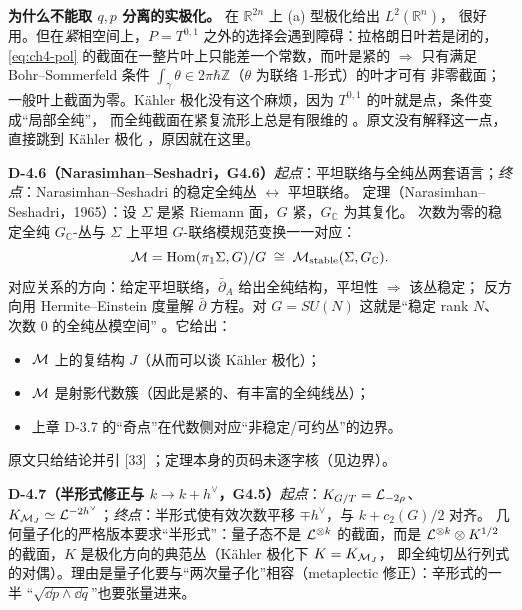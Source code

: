 \begin{keypoint}
\textbf{为什么不能取 $q,p$ 分离的实极化。} 在 $\mathbb R^{2n}$ 上 (a) 型极化给出 $L^2(\mathbb R^n)$，
很好用。但在\emph{紧}相空间上，$P=T^{0,1}$ 之外的选择会遇到障碍：拉格朗日叶若是闭的，
\eqref{eq:ch4-pol} 的截面在一整片叶上只能差一个常数，而叶是紧的 $\Rightarrow$ 只有满足
Bohr--Sommerfeld 条件 $\int_\gamma\theta\in2\pi\hbar\mathbb Z$（$\theta$ 为联络 1-形式）的叶才可有
非零截面；一般叶上截面为零。Kähler 极化没有这个麻烦，因为 $T^{0,1}$ 的叶就是点，条件变成“局部全纯”，
而全纯截面在紧复流形上总是有限维的 \ours。原文没有解释这一点，直接跳到 Kähler 极化
，原因就在这里。
\end{keypoint}

\noindent\textbf{D-4.6（Narasimhan--Seshadri，G4.6）}\quad\emph{起点}：平坦联络与全纯丛两套语言；\emph{终点}：Narasimhan--Seshadri 的稳定全纯丛 $\leftrightarrow$ 平坦联络。
定理（Narasimhan--Seshadri，1965）：设 $\Sigma$ 是紧 Riemann 面，$G$ 紧，$G_\mathbb C$ 为其复化。
次数为零的稳定全纯 $G_\mathbb C$-丛与 $\Sigma$ 上平坦 $G$-联络模规范变换一一对应：
\begin{equation}
\mathcal{M}=\operatorname{Hom}(\pi_1\Sigma,G)/G\;\cong\;\mathcal{M}_{\mathrm{stable}}(\Sigma,G_\mathbb C).
\end{equation}
对应关系的方向：给定平坦联络，$\bar\partial_A$ 给出全纯结构，平坦性 $\Rightarrow$ 该丛稳定；
反方向用 Hermite--Einstein 度量解 $\bar\partial$ 方程。对 $G=SU(N)$ 这就是“稳定 rank $N$、次数 $0$
的全纯丛模空间” 。它给出：
\begin{itemize}[leftmargin=1.6em]
\item $\mathcal{M}$ 上的复结构 $J$（从而可以谈 Kähler 极化）；
\item $\mathcal{M}$ 是射影代数簇（因此是紧的、有丰富的全纯线丛）；
\item 上章 D-3.7 的“奇点”在代数侧对应“非稳定/可约丛”的边界。
\end{itemize}
原文只给结论并引 [33] ；定理本身的页码未逐字核（见边界）。

\noindent\textbf{D-4.7（半形式修正与 $k\to k+h^\vee$，G4.5）}\quad\emph{起点}：$K_{G/T}=\mathcal{L}_{-2\rho}$、$K_{\mathcal{M}_J}\simeq\mathcal{L}^{-2h^\vee}$；\emph{终点}：半形式使有效次数平移 $\mp h^\vee$，与 $k+c_2(G)/2$ 对齐。
几何量子化的严格版本要求“半形式”：量子态不是 $\mathcal{L}^{\otimes k}$ 的截面，而是
$\mathcal{L}^{\otimes k}\otimes K^{1/2}$ 的截面，$K$ 是极化方向的典范丛（Kähler 极化下 $K=K_{\mathcal{M}_J}$，
即全纯切丛行列式的对偶）。理由是量子化要与“两次量子化”相容（metaplectic 修正）：辛形式的一半
“$\sqrt{\dd p\wedge\dd q}$”也要张量进来。

